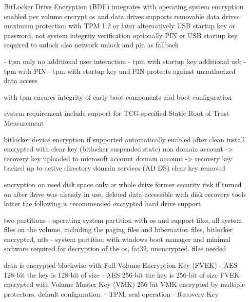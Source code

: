 \cite[8.4 BitLocker Drive encryption]{windows-internals-5}
BitLocker Drive Encryption (BDE) integrates with operating system
encryption enabled per volume
encrypt os and data drives
supports removable data drives
maximum protection with TPM 1.2 or later
alternatively USB startup key or password, not system integrity verification
optionally PIN or USB startup key required to unlock
also network unlock and pin as fallback

- tpm only
no additional user interaction
- tpm with startup key
additional usb
- tpm with PIN
- tpm with startup key and PIN
protects against unauthorized data access

with tpm ensures integrity of early boot components and boot configuration


system requirement
include support for TCG-specified Static Root of Trust Measurement

bitlocker device encryption if supported automatically enabled
after clean install encrypted with clear key (bitlocker suspended state)
non domain account -> recovery key uploaded to microsoft account
domain account -> recovery key backed up to active directory domain services (AD DS)
clear key removed

encryption on used disk space only or whole drive
former security risk if turned on after drive was already in use, deleted data accessible with disk recovery tools
latter the following is recommended
encrypted hard drive support

two partitions
- operating system partition with os and support files, all system files on the volume, including the paging files and hibernation files, bitlocker encrypted, ntfs
- system partition with windows boot manager and minimal software required for decryption of the os, fat32, unencrypted, files needed

data is encrypted blockwise with Full Volume Encryption Key (FVEK)
- AES 128-bit the key is 128-bit of size
- AES 256-bit the key is 256-bit of size
FVEK encrypted with Volume Master Key (VMK) 256 bit
VMK encrypted by multiple protectors, default configuration:
- TPM, seal operation
- Recovery Key

